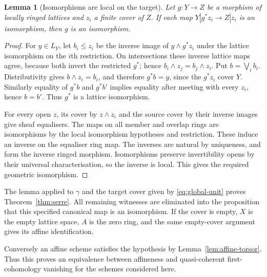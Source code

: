 \documentclass[11pt]{amsart}
\newtheorem{lemma}[theorem]{Lemma}
\theoremstyle{definition}\newtheorem{definition}[theorem]{Definition}
\theoremstyle{remark}\newtheorem{remark}[theorem]{Remark}
\begin{document}
\begin{lemma}[Isomorphisms are local on the target]\label{lem:localiso}
Let $g:Y\to Z$ be a morphism of locally ringed lattices and
$z_i$ a finite cover of $Z$. If each map
$Y|g^*z_i\to Z|z_i$ is an isomorphism, then $g$ is an isomorphism.
\end{lemma}
\begin{proof}
For $y\in L_Y$, let $b_i\le z_i$ be the inverse image of
$y\wedge g^*z_i$ under the lattice isomorphism on the $i$th
restriction. On intersections these inverse lattice maps agree,
because both invert the restricted $g^*$; hence
$b_i\wedge z_j=b_j\wedge z_i$.
Put $b=\bigvee_i b_i$. Distributivity gives $b\wedge z_i=b_i$,
and therefore $g^*b=y$, since the $g^*z_i$ cover $Y$.
Similarly equality of $g^*b$ and $g^*b'$ implies equality after
meeting with every $z_i$, hence $b=b'$. Thus $g^*$ is a lattice
isomorphism.

For every open $z$, its cover by $z\wedge z_i$ and the source
cover by their inverse images give sheaf equalisers. The maps on
all member and overlap rings are isomorphisms by the local
isomorphism hypotheses and restriction. These induce an inverse
on the equaliser ring map. The inverses are natural by uniqueness,
and form the inverse ringed morphism. Isomorphisms preserve
invertibility opens by their universal characterisation, so the
inverse is local. This gives the required geometric isomorphism.
\end{proof}

The lemma applied to $\gamma$ and the target cover given by
\eqref{eq:global-unit} proves Theorem~\ref{thm:serre}.
All remaining witnesses are eliminated into the proposition that
this specified canonical map is an isomorphism. If the cover is
empty, $X$ is the empty lattice space, $A$ is the zero ring, and
the same empty-cover argument gives its affine identification.

Conversely an affine scheme satisfies the hypothesis by
Lemma~\ref{lem:affine-torsor}. Thus this proves an equivalence
between affineness and quasi-coherent first-cohomology vanishing
for the schemes considered here.
\end{document}
